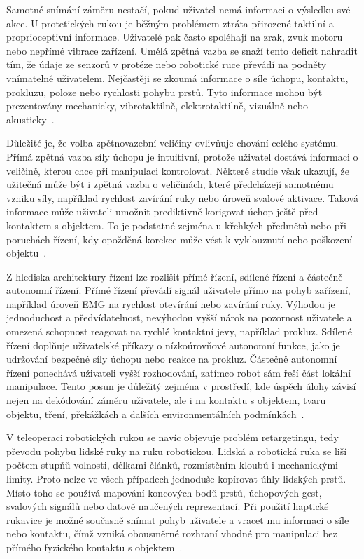 \documentclass[FZS,DP]{tulthesis}
\begin{document}
Samotné snímání záměru nestačí, pokud uživatel nemá informaci o výsledku své akce. U protetických rukou je běžným problémem ztráta přirozené taktilní a proprioceptivní informace. Uživatelé pak často spoléhají na zrak, zvuk motoru nebo nepřímé vibrace zařízení. Umělá zpětná vazba se snaží tento deficit nahradit tím, že údaje ze senzorů v protéze nebo robotické ruce převádí na podněty vnímatelné uživatelem. Nejčastěji se zkoumá informace o síle úchopu, kontaktu, prokluzu, poloze nebo rychlosti pohybu prstů. Tyto informace mohou být prezentovány mechanicky, vibrotaktilně, elektrotaktilně, vizuálně nebo akusticky~\cite{Ninu2014,Trajlinek2021,Tchimino2022920}.

Důležité je, že volba zpětnovazební veličiny ovlivňuje chování celého systému. Přímá zpětná vazba síly úchopu je intuitivní, protože uživatel dostává informaci o veličině, kterou chce při manipulaci kontrolovat. Některé studie však ukazují, že užitečná může být i zpětná vazba o veličinách, které předcházejí samotnému vzniku síly, například rychlost zavírání ruky nebo úroveň svalové aktivace. Taková informace může uživateli umožnit prediktivně korigovat úchop ještě před kontaktem s objektem. To je podstatné zejména u křehkých předmětů nebo při poruchách řízení, kdy opožděná korekce může vést k vyklouznutí nebo poškození objektu~\cite{Ninu2014,Tchimino2022920,Thomas2023110}.

Z hlediska architektury řízení lze rozlišit přímé řízení, sdílené řízení a částečně autonomní řízení. Přímé řízení převádí signál uživatele přímo na pohyb zařízení, například úroveň EMG na rychlost otevírání nebo zavírání ruky. Výhodou je jednoduchost a předvídatelnost, nevýhodou vyšší nárok na pozornost uživatele a omezená schopnost reagovat na rychlé kontaktní jevy, například prokluz. Sdílené řízení doplňuje uživatelské příkazy o nízkoúrovňové autonomní funkce, jako je udržování bezpečné síly úchopu nebo reakce na prokluz. Částečně autonomní řízení ponechává uživateli vyšší rozhodování, zatímco robot sám řeší část lokální manipulace. Tento posun je důležitý zejména v prostředí, kde úspěch úlohy závisí nejen na dekódování záměru uživatele, ale i na kontaktu s objektem, tvaru objektu, tření, překážkách a dalších environmentálních podmínkách~\cite{Thomas2023110,Xiong2024}.

V teleoperaci robotických rukou se navíc objevuje problém retargetingu, tedy převodu pohybu lidské ruky na ruku robotickou. Lidská a robotická ruka se liší počtem stupňů volnosti, délkami článků, rozmístěním kloubů i mechanickými limity. Proto nelze ve všech případech jednoduše kopírovat úhly lidských prstů. Místo toho se používá mapování koncových bodů prstů, úchopových gest, svalových signálů nebo datově naučených reprezentací. Při použití haptické rukavice je možné současně snímat pohyb uživatele a vracet mu informaci o síle nebo kontaktu, čímž vzniká obousměrné rozhraní vhodné pro manipulaci bez přímého fyzického kontaktu s objektem~\cite{Mizrahi2023,Zhang2025,GIUDICI2025}.
\end{document}
